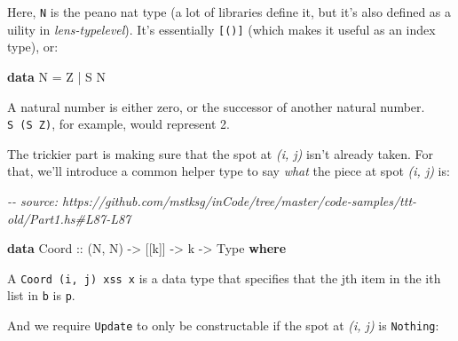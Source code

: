 \documentclass[]{article}
\newenvironment{Shaded}{}{}
\newcommand{\CommentTok}[1]{\textcolor[rgb]{0.38,0.63,0.69}{\textit{#1}}}
\newcommand{\DataTypeTok}[1]{\textcolor[rgb]{0.56,0.13,0.00}{#1}}
\newcommand{\KeywordTok}[1]{\textcolor[rgb]{0.00,0.44,0.13}{\textbf{#1}}}
\newcommand{\NormalTok}[1]{#1}
\newcommand{\OperatorTok}[1]{\textcolor[rgb]{0.40,0.40,0.40}{#1}}
\newcommand{\OtherTok}[1]{\textcolor[rgb]{0.00,0.44,0.13}{#1}}
\begin{document}
Here, \texttt{N} is the peano nat type (a lot of libraries define it, but it's
also defined as a uility in \emph{lens-typelevel}). It's essentially
\texttt{{[}(){]}} (which makes it useful as an index type), or:

\begin{Shaded}
\begin{Highlighting}[]
\KeywordTok{data} \DataTypeTok{N} \OtherTok{=} \DataTypeTok{Z} \OperatorTok{|} \DataTypeTok{S} \DataTypeTok{N}
\end{Highlighting}
\end{Shaded}

A natural number is either zero, or the successor of another natural number.
\texttt{S\ (S\ Z)}, for example, would represent 2.

The trickier part is making sure that the spot at \emph{(i, j)} isn't already
taken. For that, we'll introduce a common helper type to say \emph{what} the
piece at spot \emph{(i, j)} is:

\begin{Shaded}
\begin{Highlighting}[]
\CommentTok{{-}{-} source: https://github.com/mstksg/inCode/tree/master/code{-}samples/ttt{-}old/Part1.hs\#L87{-}L87}

\KeywordTok{data} \DataTypeTok{Coord}\OtherTok{ ::}\NormalTok{ (}\DataTypeTok{N}\NormalTok{, }\DataTypeTok{N}\NormalTok{) }\OtherTok{{-}\textgreater{}}\NormalTok{ [[k]] }\OtherTok{{-}\textgreater{}}\NormalTok{ k }\OtherTok{{-}\textgreater{}} \DataTypeTok{Type} \KeywordTok{where}
\end{Highlighting}
\end{Shaded}

A \texttt{Coord\ \textquotesingle{}(i,\ j)\ xss\ x} is a data type that
specifies that the jth item in the ith list in \texttt{b} is \texttt{p}.

And we require \texttt{Update} to only be constructable if the spot at \emph{(i,
j)} is \texttt{Nothing}:
\end{document}
